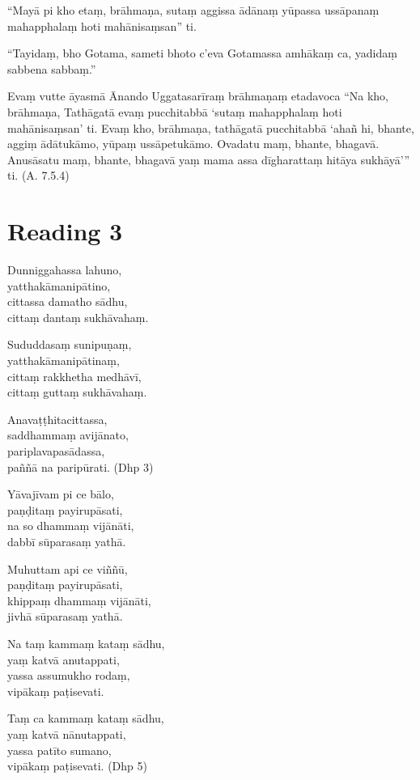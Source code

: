 “Mayā pi kho etaṃ, brāhmaṇa, sutaṃ aggissa ādānaṃ yūpassa ussāpanaṃ mahapphalaṃ hoti mahānisaṃsan” ti.

“Tayidaṃ, bho Gotama, sameti bhoto c’eva Gotamassa amhākaṃ ca, yadidaṃ sabbena sabbaṃ.”

Evaṃ vutte āyasmā Ānando Uggatasarīraṃ brāhmaṇaṃ etadavoca “Na kho, brāhmaṇa, Tathāgatā evaṃ pucchitabbā ‘sutaṃ mahapphalaṃ hoti mahānisaṃsan’ ti. Evaṃ kho, brāhmaṇa, tathāgatā pucchitabbā ‘ahañ hi, bhante, aggiṃ ādātukāmo, yūpaṃ ussāpetukāmo. Ovadatu maṃ, bhante, bhagavā. Anusāsatu maṃ, bhante, bhagavā yaṃ mama assa dīgharattaṃ hitāya sukhāyā’” ti. (A. 7.5.4)

\section*{Reading 3}

Dunniggahassa lahuno,\\
yatthakāmanipātino,\\
cittassa damatho sādhu,\\
cittaṃ dantaṃ sukhāvahaṃ.

Sududdasaṃ sunipuṇaṃ,\\
yatthakāmanipātinaṃ,\\
cittaṃ rakkhetha medhāvī,\\
cittaṃ guttaṃ sukhāvahaṃ.

Anavaṭṭhitacittassa,\\
saddhammaṃ avijānato,\\
pariplavapasādassa,\\
paññā na paripūrati. (Dhp 3)

Yāvajīvam pi ce bālo,\\
paṇḍitaṃ payirupāsati,\\
na so dhammaṃ vijānāti,\\
dabbī sūparasaṃ yathā.

Muhuttam api ce viññū,\\
paṇḍitaṃ payirupāsati,\\
khippaṃ dhammaṃ vijānāti,\\
jivhā sūparasaṃ yathā.

Na taṃ kammaṃ kataṃ sādhu,\\
yaṃ katvā anutappati,\\
yassa assumukho rodaṃ,\\
vipākaṃ paṭisevati.

Taṃ ca kammaṃ kataṃ sādhu,\\
yaṃ katvā nānutappati,\\
yassa patīto sumano,\\
vipākaṃ paṭisevati. (Dhp 5)

